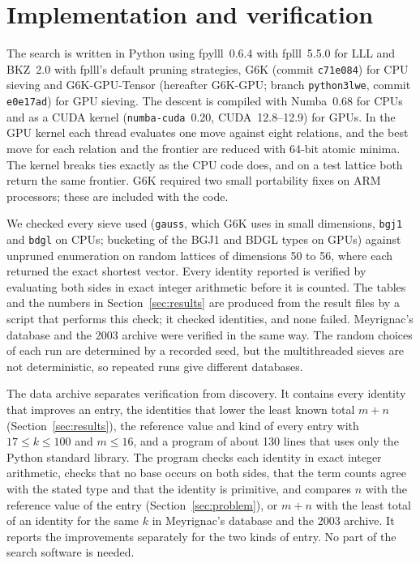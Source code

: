 \documentclass[11pt]{amsart}
\theoremstyle{definition}
\theoremstyle{remark}
\begin{document}
\section{Implementation and verification}\label{sec:impl}

The search is written in Python using fpylll~0.6.4 with fplll~5.5.0 \cite{fpylll,fplll}
for LLL and BKZ~2.0 with fplll's default pruning strategies, G6K (commit \texttt{c71e084})
\cite{AlbrechtEtAl2019,G6Krepo} for CPU sieving and G6K-GPU-Tensor (hereafter G6K-GPU; branch
\texttt{python3lwe}, commit \texttt{e0e17ad}) \cite{DucasStevensVanWoerden2021,G6KGPUrepo}
for GPU sieving. The descent is compiled with Numba~0.68 for CPUs and as a CUDA kernel
(\texttt{numba-cuda}~0.20, CUDA~12.8--12.9) for GPUs. In the GPU kernel each thread evaluates one move
against eight relations, and the best move for each relation and the frontier are reduced with
64-bit atomic minima. The kernel breaks ties exactly as the CPU code does, and on a test lattice
both return the same frontier. G6K required two small portability fixes on ARM processors;
these are included with the code.

We checked every sieve used (\texttt{gauss}, which G6K uses in small dimensions, \texttt{bgj1}
and \texttt{bdgl} on CPUs; bucketing of the BGJ1 and BDGL types on GPUs)
against unpruned enumeration on random lattices of dimensions 50 to 56, where each returned
the exact shortest vector. Every identity reported is verified by evaluating both sides in
exact integer arithmetic before it is counted. The tables and the numbers in
Section~\ref{sec:results} are produced from the result files by a script that performs this
check; it checked \NumChecked{} identities, and none failed. Meyrignac's database and the
2003 archive were verified in the same way. The random choices of each run are determined by a
recorded seed, but the multithreaded sieves are not deterministic, so repeated runs give
different databases.

The data archive separates verification from discovery. It contains every identity that
improves an entry, the identities that lower the least known total $m+n$
(Section~\ref{sec:results}), the reference value and kind of every entry with
$17\le k\le100$ and $m\le16$, and a program of about 130 lines that uses only the Python
standard library. The program checks each identity in exact integer arithmetic, checks that no
base occurs on both sides, that the term counts agree with the stated type and that the
identity is primitive, and compares $n$ with the reference value of the entry
(Section~\ref{sec:problem}), or $m+n$ with the least total of an identity for the same $k$ in
Meyrignac's database and the 2003 archive. It reports the improvements separately for the two
kinds of entry. No part of the search software is needed.
\end{document}
